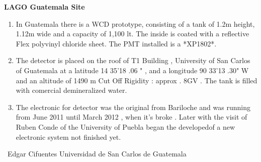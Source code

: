 \documentclass{article}
\begin{document}
\begin{center}
{\bf LAGO Guatemala Site}
\end{center}

\bigskip
\bigskip
\begin{enumerate}

\item In Guatemala there is a WCD prototype, consisting of a tank of 1.2m height, 1.12m wide and a capacity of 1,100 lt. The inside is coated with a reflective Flex polyvinyl chloride sheet. The PMT installed is a *XP1802*.
\item  The detector is placed on the roof of T1 Building , University of San Carlos of Guatemala at a latitude 14 35'18 .06 " , and a longitude 90 33'13 .30" W and an altitude of 1490 m Cut Off Rigidity : approx . 8GV . The tank is filled with comercial demineralized water.
 
 \item The electronic for detector was the original from Bariloche and was running from June 2011 until March 2012 , when it's broke . Later with the visit of Ruben Conde of the University of Puebla began the  developedof a new electronic  system not finished yet.


\end{enumerate}
\
Edgar Cifuentes
Universidad de San Carlos de Guatemala
\end{document}
